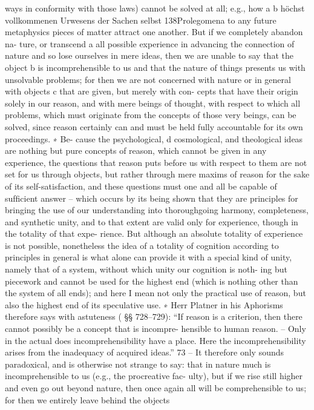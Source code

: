 ways in conformity with those laws) cannot be solved at all; e.g., how
a
b
höchst vollkommenen Urwesens
der Sachen selbst
138Prolegomena to any future metaphysics
pieces of matter attract one another. But if we completely abandon na-
ture, or transcend a all possible experience in advancing the connection
of nature and so lose ourselves in mere ideas, then we are unable to say
that the object b is incomprehensible to us and that the nature of things
presents us with unsolvable problems; for then we are not concerned with
nature or in general with objects c that are given, but merely with con-
cepts that have their origin solely in our reason, and with mere beings of
thought, with respect to which all problems, which must originate from
the concepts of those very beings, can be solved, since reason certainly
can and must be held fully accountable for its own proceedings. ∗ Be-
cause the psychological, d cosmological, and theological ideas are nothing
but pure concepts of reason, which cannot be given in any experience,
the questions that reason puts before us with respect to them are not
set for us through objects, but rather through mere maxims of reason
for the sake of its self-satisfaction, and these questions must one and
all be capable of sufﬁcient answer – which occurs by its being shown
that they are principles for bringing the use of our understanding into
thoroughgoing harmony, completeness, and synthetic unity, and to that
extent are valid only for experience, though in the totality of that expe-
rience. But although an absolute totality of experience is not possible,
nonetheless the idea of a totality of cognition according to principles
in general is what alone can provide it with a special kind of unity,
namely that of a system, without which unity our cognition is noth-
ing but piecework and cannot be used for the highest end (which is
nothing other than the system of all ends); and here I mean not only
the practical use of reason, but also the highest end of its speculative
use.
∗ Herr Platner in his Aphorisms therefore says with astuteness ( §§ 728–729): “If
reason is a criterion, then there cannot possibly be a concept that is incompre-
hensible to human reason. – Only in the actual does incomprehensibility have
a place. Here the incomprehensibility arises from the inadequacy of acquired
ideas.” 73 – It therefore only sounds paradoxical, and is otherwise not strange
to say: that in nature much is incomprehensible to us (e.g., the procreative fac-
ulty), but if we rise still higher and even go out beyond nature, then once again
all will be comprehensible to us; for then we entirely leave behind the objects
